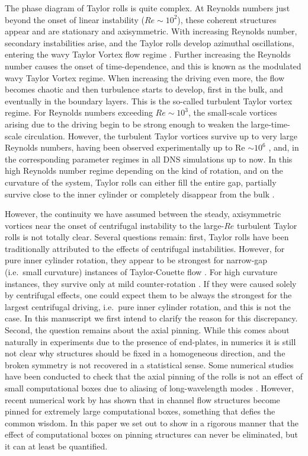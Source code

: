 \documentclass{jfm}
\begin{document}
The phase diagram of Taylor rolls is quite complex. At Reynolds numbers just beyond the onset of linear instability ($Re\sim 10^2$),  these coherent structures appear and are stationary and axisymmetric. With increasing Reynolds number, secondary instabilities arise, and the Taylor rolls develop azimuthal oscillations, entering the wavy Taylor Vortex flow regime \citep{jon85}. Further increasing the Reynolds number causes the onset of time-dependence, and this is known as the modulated wavy Taylor Vortex regime. When increasing the driving even more, the flow becomes  chaotic and then turbulence starts to develop, first in the bulk, and eventually in the boundary layers. This is the so-called turbulent Taylor vortex regime. For Reynolds numbers exceeding $Re\sim10^3$, the small-scale vortices arising due to the driving begin to be strong enough to weaken the large-time-scale circulation. However, the turbulent Taylor vortices survive up to very large Reynolds numbers, having  been observed experimentally up to Re $\sim 10^6$ \citep{hui14}, and, in the corresponding parameter regimes in all DNS simulations up to now. In this high Reynolds number regime depending on the kind of rotation, and on the curvature of the system, Taylor rolls can either fill the entire gap, partially survive close to the inner cylinder or completely disappear from the bulk \citep{ost14}. 

However, the continuity we have assumed between the steady, axisymmetric vortices near the onset of centrifugal instability to the large-$Re$ turbulent Taylor rolls is not totally clear. Several questions remain: first, Taylor rolls have been traditionally attributed to the effects of centrifugal instabilities. However, for pure inner cylinder rotation, they appear to be strongest for narrow-gap (i.e.~small curvature) instances of Taylor-Couette flow \citep{ost14}. For high curvature instances, they survive only at mild counter-rotation \citep{van16}. If they were caused solely by centrifugal effects, one could expect them to be always the strongest for the largest centrifugal driving, i.e.~pure inner cylinder rotation, and this is not the case. In this manuscript we first intend to clarify the reason for this discrepancy. Second, the question remains about the axial pinning. While this comes about naturally in experiments due to the presence of end-plates, in numerics it is still not clear why structures should be fixed in a homogeneous direction, and the broken symmetry is not recovered in a statistical sense. Some numerical studies have been conducted to check that the axial pinning of the rolls is not an effect of small computational boxes due to aliasing of long-wavelength modes \citep{ost15,ost16}. However, recent numerical work by \cite{lee18} has shown that in channel flow structures become pinned for extremely large computational boxes, something that defies the common wisdom. In this paper we set out to show in a rigorous manner that the effect of computational boxes on pinning structures can never be eliminated, but it can at least be quantified. 
\end{document}
